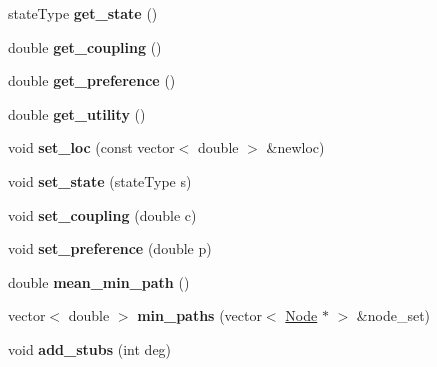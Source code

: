 \begin{DoxyCompactItemize}
\item 
\hypertarget{classNode_a181aa95b360895ddef089d101139e575}{}state\+Type {\bfseries get\+\_\+state} ()\label{classNode_a181aa95b360895ddef089d101139e575}

\item 
\hypertarget{classNode_a17942130651f990fe309dfcb07e36968}{}double {\bfseries get\+\_\+coupling} ()\label{classNode_a17942130651f990fe309dfcb07e36968}

\item 
\hypertarget{classNode_a70162b517042d6fc391179bceef4d889}{}double {\bfseries get\+\_\+preference} ()\label{classNode_a70162b517042d6fc391179bceef4d889}

\item 
\hypertarget{classNode_aa9c34bdb51c5ee84c2c5991b75ce458c}{}double {\bfseries get\+\_\+utility} ()\label{classNode_aa9c34bdb51c5ee84c2c5991b75ce458c}

\item 
\hypertarget{classNode_aa6f170ffb5f310911f8af75a1db93b3d}{}void {\bfseries set\+\_\+loc} (const vector$<$ double $>$ \&newloc)\label{classNode_aa6f170ffb5f310911f8af75a1db93b3d}

\item 
\hypertarget{classNode_a87ec83fad299cbedad57142a4e0e0d01}{}void {\bfseries set\+\_\+state} (state\+Type s)\label{classNode_a87ec83fad299cbedad57142a4e0e0d01}

\item 
\hypertarget{classNode_ac80c09e6bbfb596056f46aa0bc062dfb}{}void {\bfseries set\+\_\+coupling} (double c)\label{classNode_ac80c09e6bbfb596056f46aa0bc062dfb}

\item 
\hypertarget{classNode_adc2403ba1af5b94ef065026d483789c6}{}void {\bfseries set\+\_\+preference} (double p)\label{classNode_adc2403ba1af5b94ef065026d483789c6}

\item 
\hypertarget{classNode_ab75b1dbbb46825c3cb5329047cacb1a3}{}double {\bfseries mean\+\_\+min\+\_\+path} ()\label{classNode_ab75b1dbbb46825c3cb5329047cacb1a3}

\item 
\hypertarget{classNode_a989a2bec38b01c8048535fac84aa01ad}{}vector$<$ double $>$ {\bfseries min\+\_\+paths} (vector$<$ \hyperlink{classNode}{Node} $\ast$ $>$ \&node\+\_\+set)\label{classNode_a989a2bec38b01c8048535fac84aa01ad}

\item 
\hypertarget{classNode_a35610e36dabdf0ac0d31c858ba9dce76}{}void {\bfseries add\+\_\+stubs} (int deg)\label{classNode_a35610e36dabdf0ac0d31c858ba9dce76}


\end{DoxyCompactItemize}
